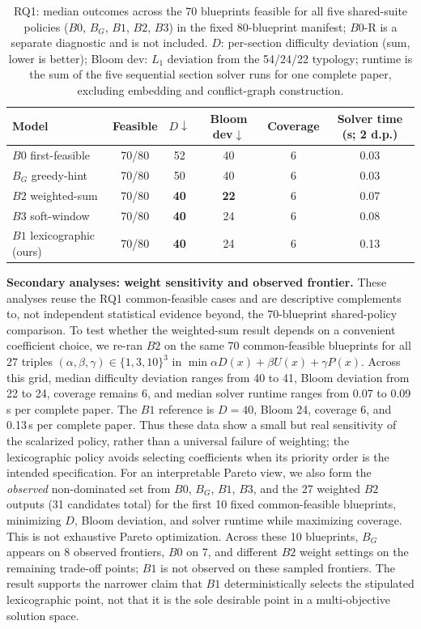 \documentclass[runningheads]{llncs}
\begin{document}
\begin{table}[t]
\caption{RQ1: median outcomes across the 70 blueprints feasible for all five shared-suite policies ($B0$, $B_G$, $B1$, $B2$, $B3$) in the fixed 80-blueprint manifest;
$B0$-R is a separate diagnostic and is not included. $D$: per-section difficulty deviation (sum, lower is better);
Bloom dev: $L_1$ deviation from the 54/24/22 typology; runtime is the sum of the five sequential section solver runs for one complete paper, excluding embedding and conflict-graph construction.}
\label{tab:rq1}
\centering
\small
\begin{tabular}{lccccc}
\toprule
\textbf{Model} & \textbf{Feasible} & $D\downarrow$ & \textbf{Bloom dev}$\downarrow$ & \textbf{Coverage} & \textbf{Solver time (s; 2 d.p.)} \\
\midrule
$B0$ first-feasible        & 70/80 & 52 & 40 & 6 & 0.03 \\
$B_G$ greedy-hint          & 70/80 & 50 & 40 & 6 & 0.03 \\
$B2$ weighted-sum          & 70/80 & \textbf{40} & \textbf{22} & 6 & 0.07 \\
$B3$ soft-window           & 70/80 & \textbf{40} & 24 & 6 & 0.08 \\
$B1$ lexicographic (ours)  & 70/80 & \textbf{40} & 24 & 6 & 0.13 \\
\bottomrule
\end{tabular}
\end{table}

\noindent\textbf{Secondary analyses: weight sensitivity and observed frontier.} These analyses reuse the RQ1 common-feasible cases and are descriptive complements to, not independent statistical evidence beyond, the 70-blueprint shared-policy comparison.
To test whether the weighted-sum result depends on a convenient coefficient choice, we re-ran $B2$ on the same 70 common-feasible blueprints for all $27$ triples $(\alpha,\beta,\gamma)\in\{1,3,10\}^3$ in $\min\alpha D(x)+\beta U(x)+\gamma P(x)$.
Across this grid, median difficulty deviation ranges from 40 to 41, Bloom deviation from 22 to 24, coverage remains 6, and median solver runtime ranges from 0.07 to 0.09\,s per complete paper.
The $B1$ reference is $D{=}40$, Bloom 24, coverage 6, and 0.13\,s per complete paper.
Thus these data show a small but real sensitivity of the scalarized policy, rather than a universal failure of weighting;
the lexicographic policy avoids selecting coefficients when its priority order is the intended specification.
For an interpretable Pareto view, we also form the \emph{observed} non-dominated set from $B0$, $B_G$, $B1$, $B3$, and the 27 weighted $B2$ outputs (31 candidates total) for the first 10 fixed common-feasible blueprints, minimizing $D$, Bloom deviation, and solver runtime while maximizing coverage.
This is not exhaustive Pareto optimization. Across these 10 blueprints, $B_G$ appears on 8 observed frontiers, $B0$ on 7, and different $B2$ weight settings on the remaining trade-off points;
$B1$ is not observed on these sampled frontiers. The result supports the narrower claim that $B1$ deterministically selects the stipulated lexicographic point, not that it is the sole desirable point in a multi-objective solution space.
\end{document}
